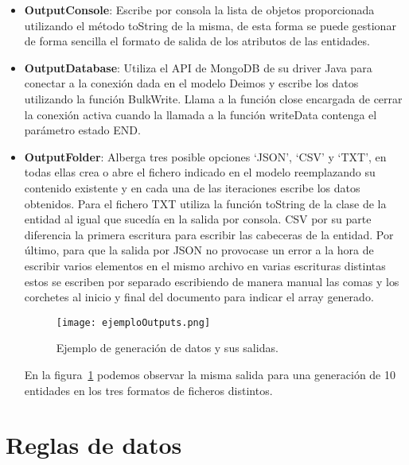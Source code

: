 \begin{itemize}
  \item \textbf{OutputConsole}: Escribe por consola la lista de objetos proporcionada utilizando el método toString de la misma, de esta forma se puede gestionar de forma sencilla el formato de salida de los atributos de las entidades.
  \item \textbf{OutputDatabase}: Utiliza el API de MongoDB de su driver Java para conectar a la conexión dada en el modelo Deimos y escribe los datos utilizando la función BulkWrite. Llama a la función close encargada de cerrar la conexión activa cuando la llamada a la función writeData contenga el parámetro estado END.
  \item \textbf{OutputFolder}: Alberga tres posible opciones `JSON', `CSV' y `TXT', en todas ellas crea o abre el fichero indicado en el modelo reemplazando su contenido existente y en cada una de las iteraciones escribe los datos obtenidos. Para el fichero TXT utiliza la función toString de la clase de la entidad al igual que sucedía en la salida por consola. CSV por su parte diferencia la primera escritura para escribir las cabeceras de la entidad. Por último, para que la salida por JSON no provocase un error a la hora de escribir varios elementos en el mismo archivo en varias escrituras distintas estos se escriben por separado escribiendo de manera manual las comas y los corchetes al inicio y final del documento para indicar el array generado.
  
  \begin{figure}[h!]
    \centerline{\texttt{[image: ejemploOutputs.png]}}
    \caption{Ejemplo de generación de datos y sus salidas.}
    \label{figure:outputExample}
  \end{figure}

  En la figura~\ref{figure:outputExample} podemos observar la misma salida para una generación de 10 entidades en los tres formatos de ficheros distintos.
\end{itemize}

\section{Reglas de datos}




